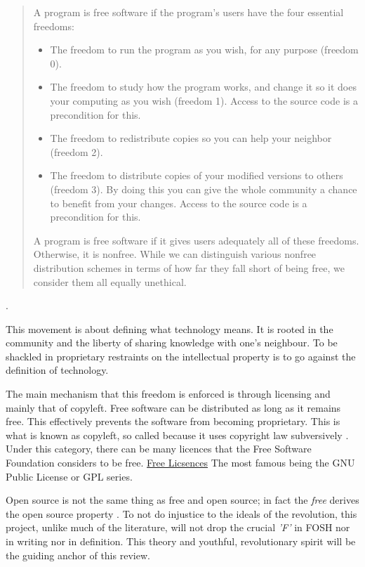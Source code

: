 \documentclass{article}
\begin{document}
\begin{quote}
    A program is free software if the program’s users have the four essential freedoms:

    \begin{itemize}
        \item The freedom to run the program as you wish, for any purpose (freedom 0).
        \item The freedom to study how the program works, and change it so it does your computing as you wish (freedom 1). 
            Access to the source code is a precondition for this.
        \item The freedom to redistribute copies so you can help your neighbor (freedom 2).
        \item The freedom to distribute copies of your modified versions to others (freedom 3). 
            By doing this you can give the whole community a chance to benefit from your changes. Access to the source code is a precondition for this.
    \end{itemize}
    A program is free software if it gives users adequately all of these freedoms. Otherwise, it is nonfree. 
    While we can distinguish various nonfree distribution schemes in terms of how far they fall short of being free, we consider them all equally unethical.
\end{quote} \cite{b0_stallman}.

This movement is about defining what technology means. 
It is rooted in the community and the liberty of sharing knowledge with one's neighbour. 
To be shackled in proprietary restraints on the intellectual property is to go against the definition of technology.

The main mechanism that this freedom is enforced is through licensing and mainly that of copyleft. 
Free software can be distributed as long as it remains free. 
This effectively prevents the software from becoming proprietary. 
This is what is known as copyleft, so called because it uses copyright law subversively \cite{b0_stallman}.
Under this category, there can be many licences that the Free Software Foundation considers to be free.
\href{https://www.gnu.org/licenses/license-list.html}{Free Licsences}
The most famous being the GNU Public License or GPL series.

Open source is not the same thing as free and open source; in fact the \textit{free} derives the open source property \cite{b0_stallman}. 
To not do injustice to the ideals of the revolution, this project, unlike much of the literature, will not drop the crucial \textit{'F'} in FOSH nor in writing nor in definition.
This theory and youthful, revolutionary spirit will be the guiding anchor of this review.
\end{document}
